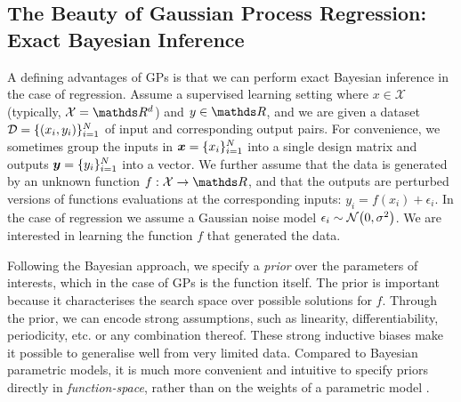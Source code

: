 \subsection{The Beauty of Gaussian Process Regression: Exact Bayesian Inference}

A defining advantages of GPs is that we can perform exact Bayesian inference in the case of regression. %
Assume a supervised learning setting where $x \in \mathcal{X}$ (typically, $\mathcal{X} = \Reals^d$) and $y \in \Reals$, and we are given a dataset $\mathcal{D} = \{(x_i, y_i)\}_{i=1}^N$ of input and corresponding output pairs. For convenience, we sometimes group the inputs in $\bm{x} = \{x_i\}_{i=1}^N$ into a single design matrix and outputs $\bm{y} = \{y_i\}_{i=1}^N$ into a vector. We further assume that the data is generated by an unknown function $f: \mathcal{X} \rightarrow \Reals$, and that the outputs are perturbed versions of functions evaluations at the corresponding inputs: $y_i = f(x_i) + \epsilon_i$. In the case of regression we assume a Gaussian noise model $\epsilon_i \sim \NormDist{0, \sigma^2}$. We are interested in learning the function $f$ that generated the data. %


Following the Bayesian approach, we specify a \emph{prior} over the parameters of interests, which in the case of GPs is the function itself. The prior is important because it characterises the search space over possible solutions for $f$. Through the prior, we can encode strong assumptions, such as linearity, differentiability, periodicity, etc. or any combination thereof. These strong inductive biases make it possible to generalise well from very limited data. Compared to Bayesian parametric models, it is much more convenient and intuitive to specify priors directly in \emph{function-space}, rather than on the weights of a parametric model \citep{rasmussen2006}. 

